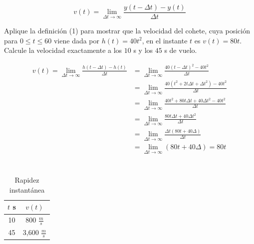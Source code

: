 \documentclass[12pt]{article}
\begin{document}
\begin{enumerate}
  \begin{equation}
    v(t) = \lim_{\Delta t \rightarrow \infty}\frac{y(t - \Delta t) - y(t)}{\Delta t}
  \end{equation}
  
  Aplique la definición (1) para mostrar que la velocidad del cohete, cuya posición para $0 \leq t \leq 60$ viene dada por $h(t) = 40t^2$, en el instante $t$ es $v(t) = 80t$. Calcule la velocidad exactamente a los $10$ s y los $45$ s de vuelo.
  
    \begin{align*}
        v(t) = \lim_{\Delta t \rightarrow \infty}\frac{h(t - \Delta t) - h(t)}{\Delta t}&= \lim_{\Delta t \rightarrow \infty}\frac{40(t - \Delta t)^2 - 40t^2}{\Delta t}\\
        &=\lim_{\Delta t \rightarrow \infty}\frac{40(t^2+2t\Delta t + \Delta t^2) - 40t^2}{\Delta t}\\
        &=\lim_{\Delta t \rightarrow \infty}\frac{40t^2+80t\Delta t + 40\Delta t^2 - 40t^2}{\Delta t}\\
        &=\lim_{\Delta t \rightarrow \infty}\frac{80t\Delta t + 40\Delta t^2}{\Delta t}\\
        &=\lim_{\Delta t \rightarrow \infty}\frac{\Delta t(80t+ 40\Delta)}{\Delta t}\\
        &=\lim_{\Delta t \rightarrow \infty}(80t+ 40\Delta) = 80t\\
    \end{align*}\\
    
    \begin{table}[h]
  
        \begin{center}
  
            \begin{tabular}{| c | c |}\hline %
                $t$ s & $v(t)$\\ \hline
                10 & 800 $\frac{m}{s}$\\ 
                45& 3,600 $\frac{m}{s}$  \\ \hline
            \end{tabular}
  
            \caption{Rapidez instantánea} 
  
            \label{tab:rapinst}
  
        \end{center}
  
    \end{table}
    
\end{enumerate}
\end{document}
